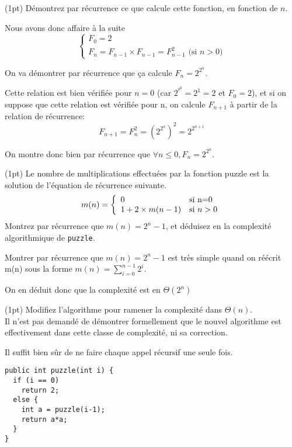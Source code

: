\documentclass[10pt]{article}\usepackage[correction,nu]{esial}
\begin{document}
\Question(1pt) Démontrez par récurrence ce que calcule cette fonction, en
fonction de $n$. %

\begin{Reponse}
  Nous avons donc affaire à la suite
  $$\left\{
  \begin{array}{l}
    F_0=2\\
    F_n=F_{n-1}\times F_{n-1}=F_{n-1}^2 \text{ (si }n>0)
  \end{array}
  \right.$$

  On va démontrer par récurrence que ça calcule $F_n=2^{2^n}$. 

  Cette relation est bien vérifiée pour $n=0$ (car $2^{²^0}=2^1=2$ et $F_0=2$),
  et  si on suppose que cette relation est vérifiée pour n, on calcule
  $F_{n+1}$ à partir de la relation de récurrence:
  $$F_{n+1}=F_n^2=\left(2^{2^n}\right)^2=2^{2^{n+1}}$$

  On montre donc bien par récurrence que $\forall n\leq0, F_n=2^{2^{n}}$.
\end{Reponse}


\Question(1pt) Le nombre de 
multiplications effectuées par la fonction puzzle est la solution de l'équation
de récurrence suivante.
$$m(n)=\left\{
\begin{array}[l]{ll}
  0&\text{si n=0}\\
  1+2\times m(n-1)&\text{si }n>0\\
\end{array}\right.
$$
Montrez par récurrence que $m(n)=2^n-1$, et déduisez en la complexité
algorithmique de  \texttt{puzzle}.
\begin{Reponse}
  Montrer par récurrence que $m(n)=2^n-1$ est très simple quand on réécrit m(n)
  sous la forme $\displaystyle m(n)=\sum_{i=0}^{n-1} 2^i$.

  On en déduit donc que la complexité est en $\Theta(2^n)$
\end{Reponse}

\Question(1pt) Modifiez l'algorithme pour ramener la complexité
dans $\Theta(n)$. \\
Il n'est pas demandé de démontrer formellement que le nouvel algorithme est
effectivement dans cette classe de complexité, ni sa correction.
\begin{Reponse}
  Il suffit bien sûr de ne faire chaque appel récursif une seule fois.

\begin{Verbatim}[numbers=right]
public int puzzle(int i) {
  if (i == 0)     
    return 2;
  else {
    int a = puzzle(i-1); 
    return a*a;
  }
}
\end{Verbatim}

\end{Reponse}
\end{document}
